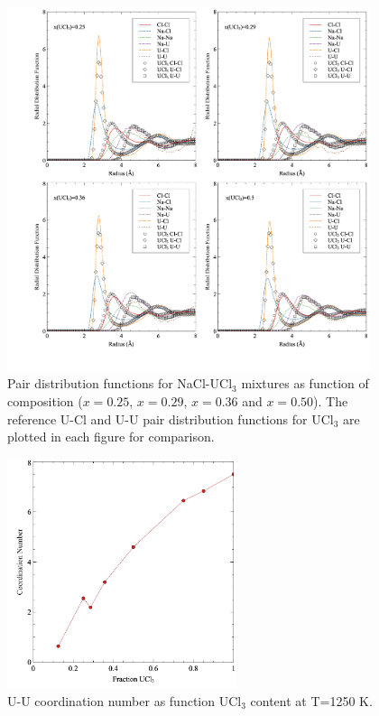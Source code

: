 \documentclass[preprint,3p,10pt,onecolumn,number,sort&compress]{elsarticle}
\begin{document}
{ \begin{figure}[htb]
\centering
\includegraphics[width=0.95\textwidth]{fig13.jpg}
\caption{Pair distribution functions for NaCl-UCl$_3$ mixtures as function of composition ($x=0.25$, $x=0.29$, $x=0.36$ and $x=0.50$). The reference U-Cl and U-U pair distribution functions for UCl$_3$ are plotted in each figure for comparison.} 
\label{fig:fig_pair}
\end{figure}


 \begin{figure}[htb]
\centering
\includegraphics[width=0.6\textwidth]{fig14.jpg}
\caption{U-U coordination number as function UCl$_3$ content at T=1250 K.} %
\label{fig:fig_coord}
\end{figure}



}
\end{document}
